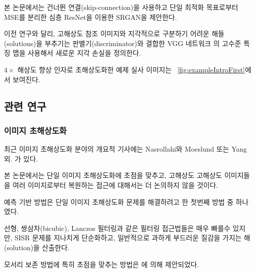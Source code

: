\documentclass[10pt,twocolumn,letterpaper]{article}
\newcommand{\kor}[1]{#1}
\newcommand{\eng}[1]{}
\begin{document}
\eng{
In this work we propose a \ac{SRGAN} for which we employ a deep \ac{ResNet} with skip-connection and diverge from \ac{MSE} as the sole optimization target.
}\kor{
본 논문에서는 건너뛴 연결(skip-connection)을 사용하고 단일 최적화 목표로부터 \ac{MSE}를 분리한 심층 \ac{ResNet}을 이용한 \ac{SRGAN}을 제안한다.
}\eng{
 Different from previous works, we define a novel perceptual loss using high-level feature maps of the VGG network \cite{simonyan2014very,Johnson16PercepLoss,bruna2016super} combined with a discriminator that encourages solutions perceptually hard to distinguish from the \ac{HR} reference images.
}\kor{
 이전 연구와 달리, \ac{고해상도} 참조 이미지와 지각적으로 구분하기 어려운 해들(solutions)을 부추기는 판별기(discriminator)와 결합한 VGG 네트워크 \cite{simonyan2014very,Johnson16PercepLoss,bruna2016super}의 고수준 특징 맵을 사용해서 새로운 지각 손실을 정의한다.
}
\eng{
An example photo-realistic image that was super-resolved with a $4\times$ upscaling factor is shown in \figurename~\ref{fig:exampleIntroFirst}.
}\kor{
$4\times$ 해상도 향상 인자로 초해상도화한 예제 실사 이미지는 \figurename~\ref{fig:exampleIntroFirst}에서 보여진다.
}

\subsection{관련 연구}
\subsubsection{이미지 초해상도화}
\eng{
Recent overview articles on image \ac{SR} include Nasrollahi and Moeslund \cite{Nasrollahi2014} or Yang et al. \cite{Yang14benchmark}.
}\kor{
최근 이미지 \ac{초해상도화} 분야의 개요적 기사에는 Nasrollahi와 Moeslund \cite{Nasrollahi2014} 또는 Yang 외. 가 있다.
}\eng{
Here we will focus on \ac{SISR} and will not further discuss approaches that recover \ac{HR} images from multiple images \cite{Borman1998aSurvey,Farsiu2004}.
}\kor{
본 논문에서는 \ac{단일 이미지 초해상도화}에 초점을 맞추고, 고해상도 \ac{고해상도} 이미지들을 여러 이미지로부터 복원하는 \cite{Borman1998aSurvey,Farsiu2004} 접근에 대해서는 더 논의하지 않을 것이다.
}


\eng{
Prediction-based methods were among the first methods to tackle \ac{SISR}.
}\kor{
예측 기반 방법은 \ac{단일 이미지 초해상도화} 문제를 해결하려고 한 첫번째 방법 중 하나였다.
} \eng{
While these filtering approaches, \eg linear, bicubic or Lanczos \cite{Duchon1979} filtering, can be very fast, they oversimplify the \ac{SISR} problem and usually yield solutions with overly smooth textures.
}\kor{
\eg 선형, 쌍삼차(bicubic), Lanczos \cite{Duchon1979} 필터링과 같은 필터링 접근법들은 매우 빠를수 있지만, \ac{SISR} 문제를 지나치게 단순화하고, 일반적으로 과하게 부드러운 질감을 가지는 해(solution)을 산출한다.
}
\eng{
Methods that put particularly focus on edge-preservation have been proposed \cite{Allebach96, Li2001}.
}\kor{
모서리 보존 방법에 특히 초점을 맞추는 방법은 \cite{Allebach96, Li2001}에 의해 제안되었다.
}
\end{document}
